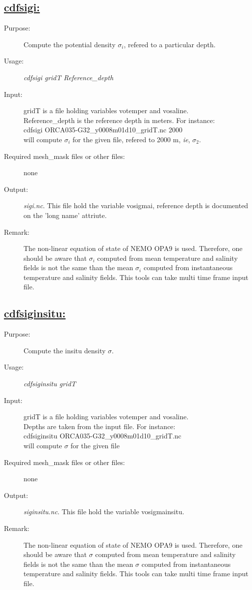 \documentclass[a4paper,11pt]{article}
\begin{document}
\subsection*{\underline{cdfsigi:}}
\begin{description}
\item[Purpose:] Compute the potential density ${\sigma}_i$, refered to a particular depth.
\item[Usage:] {\em cdfsigi gridT Reference\_depth}
\item[Input:] gridT is a file holding variables votemper and vosaline.\\
       Reference\_depth is the reference depth in meters.     
For instance:\\
    cdfsigi  ORCA035-G32\_y0008m01d10\_gridT.nc 2000 \\
will compute ${\sigma}_i$ for the given file, refered to 2000 m, {\it ie}, ${\sigma}_2$.
\item[Required mesh\_mask files or other files:]  none
\item[Output:] {\em sigi.nc}. This file hold the variable vosigmai, reference depth is documented on the 'long name' attriute.
\item[Remark:]  The non-linear equation of state of NEMO OPA9 is used. Therefore, one should be aware that  ${\sigma}_i$
computed from mean temperature and salinity fields is not the same than the mean ${\sigma}_i$ computed from instantaneous
temperature and salinity fields. This tools can take multi time frame input file.
\end{description}

\subsection*{\underline{cdfsiginsitu:}}
\begin{description}
\item[Purpose:] Compute the insitu density ${\sigma}$.
\item[Usage:] {\em cdfsiginsitu gridT }
\item[Input:] gridT is a file holding variables votemper and vosaline.\\
       Depths are taken from the input file.
For instance:\\
    cdfsiginsitu  ORCA035-G32\_y0008m01d10\_gridT.nc  \\
will compute ${\sigma}$ for the given file
\item[Required mesh\_mask files or other files:]  none
\item[Output:] {\em siginsitu.nc}. This file hold the variable vosigmainsitu.
\item[Remark:]  The non-linear equation of state of NEMO OPA9 is used. Therefore, one should be aware that  ${\sigma}$
computed from mean temperature and salinity fields is not the same than the mean ${\sigma}$ computed from instantaneous
temperature and salinity fields. This tools can take multi time frame input file.
\end{description}
\end{document}
